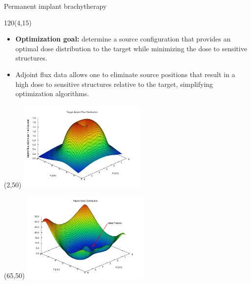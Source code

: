 \documentclass{beamer}
\begin{document}
\begin{frame}{Permanent implant brachytherapy}

  \begin{textblock}{120}(4,15)
    \begin{itemize}
      \item \textbf{Optimization goal:} determine a source configuration
        that provides an optimal dose distribution to the target while
        minimizing the dose to sensitive structures.
      \item Adjoint flux data allows one to eliminate source positions that 
        result in a high dose to sensitive structures relative to the target,
        simplifying optimization algorithms.
    \end{itemize}
  \end{textblock}

   \begin{textblock}{20}(2,50)
    \includegraphics[width=2.5in]{figures/Target_adjoint_flux-midplane.pdf}
  \end{textblock}

   \begin{textblock}{20}(65,50)
    \includegraphics[width=2.5in]{figures/adjoint_ratio-slice5.pdf}
  \end{textblock}

\end{frame}
\end{document}
